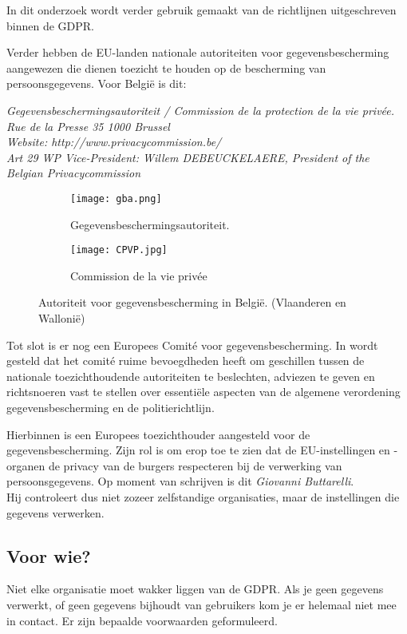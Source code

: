 In dit onderzoek wordt verder gebruik gemaakt van de richtlijnen uitgeschreven binnen de GDPR. 

Verder hebben de EU-landen nationale autoriteiten voor gegevensbescherming aangewezen die dienen toezicht te houden op de bescherming van persoonsgegevens. Voor België is dit: 

\quad \textit{Gegevensbeschermingsautoriteit / Commission de la protection de la vie privée. \\ \quad Rue de la Presse 35 1000 Brussel \\  \quad Website: http://www.privacycommission.be/ \\ 
    \quad Art 29 WP Vice-President: Willem DEBEUCKELAERE, President of the Belgian Privacycommission} 

\begin{figure}[h]
	\centering
	\begin{subfigure}{0.4\textwidth}
		\centering
		\texttt{[image: gba.png]}
		\caption{Gegevensbeschermingsautoriteit.}
	\end{subfigure}
	\begin{subfigure}{0.5\textwidth}
		\centering
		\texttt{[image: CPVP.jpg]}
		\caption{Commission de la vie privée}
	\end{subfigure}%
	\caption{Autoriteit voor gegevensbescherming in België. (Vlaanderen en Wallonië)}
\end{figure}

Tot slot is er nog een Europees Comité voor gegevensbescherming. In \textcite{Eucom2018} wordt gesteld dat het comité ruime bevoegdheden heeft om geschillen tussen de nationale toezichthoudende autoriteiten te beslechten, adviezen te geven en richtsnoeren vast te stellen over essentiële aspecten van de algemene verordening gegevensbescherming en de politierichtlijn.



Hierbinnen is een Europees toezichthouder aangesteld voor de gegevensbescherming. Zijn rol is om erop toe te zien dat de EU-instellingen en -organen de privacy van de burgers respecteren bij de verwerking van persoonsgegevens. Op moment van schrijven is dit \textit{Giovanni Buttarelli}. 
\\ Hij controleert dus niet zozeer zelfstandige organisaties, maar de instellingen die gegevens verwerken. 


\subsection{Voor wie? }
Niet elke organisatie moet wakker liggen van de GDPR. Als je geen gegevens verwerkt, of geen gegevens bijhoudt van gebruikers kom je er helemaal niet mee in contact. 
Er zijn bepaalde voorwaarden geformuleerd. 

